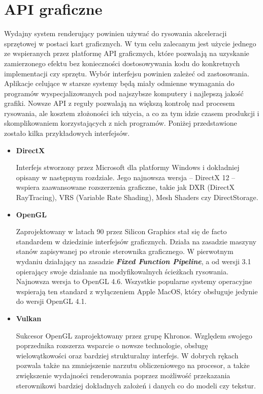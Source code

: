 \section{API graficzne}

Wydajny system renderujący powinien używać do rysowania akceleracji sprzętowej w postaci kart graficznych. W tym celu zalecanym jest użycie jednego ze wspieranych przez platformę API graficznych, które pozwalają na uzyskanie zamierzonego efektu bez konieczności dostosowywania kodu do konkretnych implementacji czy sprzętu. Wybór interfejsu powinien zależeć od zastosowania. Aplikacje celujące w starsze systemy będą miały odmienne wymagania do programów wyspecjalizowanych pod najszybsze komputery i najlepszą jakość grafiki. Nowsze API z reguły pozwalają na większą kontrolę nad procesem rysowania, ale kosztem złożoności ich użycia, a co za tym idzie czasem produkcji i skomplikowaniem korzystających z nich programów. Poniżej przedstawione zostało kilka przykładowych interfejsów.

\begin{itemize}
	\item \textbf{DirectX}

	Interfejs stworzony przez Microsoft dla platformy Windows i dokładniej opisany w następnym rozdziale. Jego najnowsza wersja -- DirectX 12 -- wspiera zaawansowane rozszerzenia graficzne, takie jak DXR (DirectX RayTracing), VRS (Variable Rate Shading), Mesh Shaders czy DirectStorage.
	
	\item \textbf{OpenGL}

	Zaprojektowany w latach 90 przez Silicon Graphics stał się de facto standardem w dziedzinie interfejsów graficznych. Działa na zasadzie maszyny stanów zapisywanej po stronie sterownika graficznego. W pierwotnym wydaniu działający na zasadzie \emph{\textbf{Fixed Function Pipeline}}, a od wersji 3.1 opierający swoje działanie na modyfikowalnych ścieżkach rysowania. Najnowsza wersja to OpenGL 4.6. Wszystkie popularne systemy operacyjne wspierają ten standard z wyłączeniem Apple MacOS, który obsługuje jedynie do wersji OpenGL 4.1.

	\item \textbf{Vulkan}
	
	Sukcesor OpenGL zaprojektowany przez grupę Khronos. Względem swojego poprzednika rozszerza wsparcie o nowsze technologie, obsługę wielowątkowości oraz bardziej strukturalny interfejs. W dobrych rękach pozwala także na zmniejszenie narzutu obliczeniowego na procesor, a także zwiększenie wydajności renderowania poprzez możliwość przekazania sterownikowi bardziej dokładnych założeń i danych co do modeli czy tekstur.
\end{itemize}


